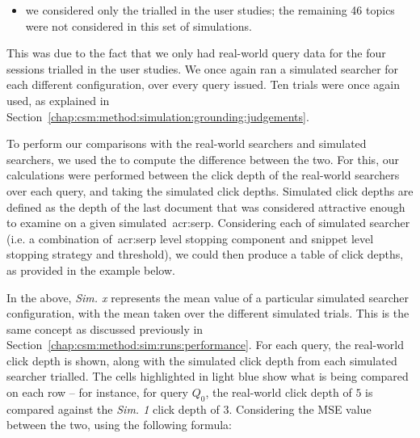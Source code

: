 \begin{itemize}
    \item{we considered only the  trialled in the user studies; the remaining 46 topics were not considered in this set of simulations.}
\end{itemize}

This was due to the fact that we only had real-world query data for the four sessions trialled in the user studies. We once again ran a simulated searcher for each different configuration, over every query issued. Ten trials were once again used, as explained in Section~\ref{chap:csm:method:simulation:grounding:judgements}.

To perform our comparisons with the real-world searchers and simulated searchers, we used the  to compute the difference between the two. For this, our calculations were performed between the click depth of the real-world searchers over each query, and taking the simulated click depths. Simulated click depths are defined as the depth of the last document that was considered attractive enough to examine on a given simulated~\gls{acr:serp}. Considering each of simulated searcher (i.e. a combination of~\gls{acr:serp} level stopping component and snippet level stopping strategy and threshold), we could then produce a table of click depths, as provided in the example below.

\begin{figure}[h]
    \centering
    \vspace*{-6mm}
\end{figure}

In the above, \emph{Sim. x} represents the mean value of a particular simulated searcher configuration, with the mean taken over the different simulated trials. This is the same concept as discussed previously in Section~\ref{chap:csm:method:sim:runs:performance}. For each query, the real-world click depth is shown, along with the simulated click depth from each simulated searcher trialled. The cells highlighted in light blue show what is being compared on each row -- for instance, for query $Q_0$, the real-world click depth of $5$ is compared against the \emph{Sim. 1} click depth of $3$. Considering the MSE value between the two, using the following formula:

